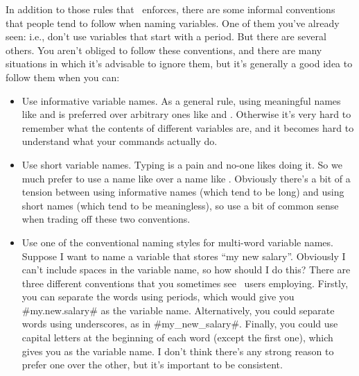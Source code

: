\noindent
In addition to those rules that \R\ enforces, there are some informal conventions that people tend to follow when naming variables. One of them you've already seen: i.e., don't use variables that start with a period. But there are several others. You aren't obliged to follow these conventions, and there are many situations in which it's advisable to ignore them, but it's generally a good idea to follow them when you can:

\begin{itemize}
\item Use informative variable names. As a general rule, using meaningful names like  and  is preferred over arbitrary ones like  and . Otherwise it's very hard to remember what the contents of different variables are, and it becomes hard to understand what your commands actually do. 
\item Use short variable names. Typing is a pain and no-one likes doing it. So we much prefer to use a name like  over a name like . Obviously there's a bit of a tension between using informative names (which tend to be long) and using short names (which tend to be meaningless), so use a bit of common sense when trading off these two conventions.
\item Use one of the conventional naming styles for multi-word variable names. Suppose I want to name a variable that stores ``my new salary''. Obviously I can't include spaces in the variable name, so how should I do this? There are three different conventions that you sometimes see \R\ users employing. Firstly, you can separate the words using periods, which would give you \rtextverb#my.new.salary# as the variable name. Alternatively, you could separate words using underscores, as in \rtextverb#my_new_salary#. Finally, you could use capital letters at the beginning of each word (except the first one), which gives you  as the variable name. I don't think there's any strong reason to prefer one over the other, but it's important to be consistent.
\end{itemize}




